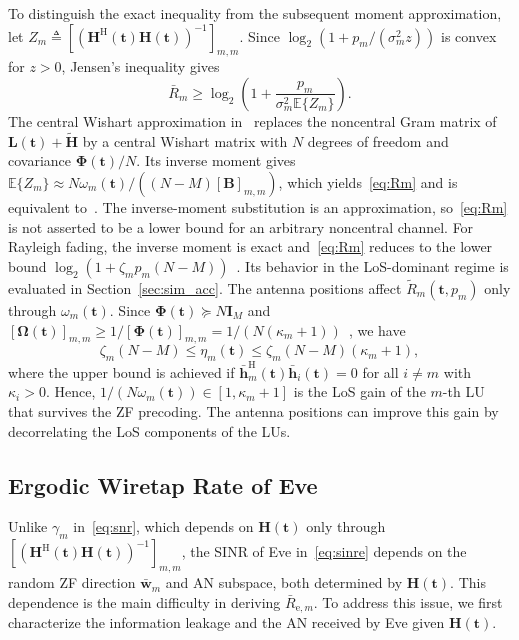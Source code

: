 \documentclass[journal]{IEEEtran}
\newcommand{\E}{\mathbb{E}}
\newcommand{\bt}{\mathbf{t}}
\newcommand{\hb}{\bar{\mathbf{h}}}
\newcommand{\bH}{\mathbf{H}}
\newcommand{\Htl}{\tilde{\mathbf{H}}}
\newcommand{\bB}{\mathbf{B}}
\newcommand{\bL}{\mathbf{L}}
\newcommand{\bI}{\mathbf{I}}
\newcommand{\wb}{\bar{\mathbf{w}}}
\newcommand{\bOm}{\boldsymbol{\Omega}}
\newcommand{\bPhi}{\boldsymbol{\Phi}}
\begin{document}
To distinguish the exact inequality from the subsequent moment approximation, let $Z_m\triangleq[(\bH^{\mathrm{H}}(\bt)\bH(\bt))^{-1}]_{m,m}$. Since $\log_2(1+p_m/(\sigma_m^2 z))$ is convex for $z>0$, Jensen's inequality gives
\begin{equation}\label{eq:lu_jensen_exact}
\bar R_m\ge
\log_2\!\left(1+\frac{p_m}{\sigma_m^2\E\{Z_m\}}\right).
\end{equation}
The central Wishart approximation in~\cite{ZhangJSTSP2014} replaces the noncentral Gram matrix of $\bL(\bt)+\Htl$ by a central Wishart matrix with $N$ degrees of freedom and covariance $\bPhi(\bt)/N$. Its inverse moment gives $\E\{Z_m\}\approx N\omega_m(\bt)/((N-M)[\bB]_{m,m})$, which yields~\eqref{eq:Rm} and is equivalent to~\cite[Sec.~IV-A]{ZhengTCOM2025}. The inverse-moment substitution is an approximation, so~\eqref{eq:Rm} is not asserted to be a lower bound for an arbitrary noncentral channel. For Rayleigh fading, the inverse moment is exact and~\eqref{eq:Rm} reduces to the lower bound $\log_2(1+\zeta_mp_m(N-M))$~\cite{Ngo2013}. Its behavior in the LoS-dominant regime is evaluated in Section~\ref{sec:sim_acc}. The antenna positions affect $\tilde R_m(\bt,p_m)$ only through $\omega_m(\bt)$. Since $\bPhi(\bt)\succeq N\bI_M$ and $[\bOm(\bt)]_{m,m}\ge1/[\bPhi(\bt)]_{m,m}=1/(N(\kappa_m+1))$~\cite{Horn2013}, we have
\begin{equation}\label{eq:etabound}
\zeta_m(N-M)\le\eta_m(\bt)\le\zeta_m(N-M)(\kappa_m+1),
\end{equation}
where the upper bound is achieved if $\hb_m^{\mathrm{H}}(\bt)\hb_i(\bt)=0$ for all $i\neq m$ with $\kappa_i>0$. Hence, $1/(N\omega_m(\bt))\in[1,\kappa_m+1]$ is the LoS gain of the $m$-th LU that survives the ZF precoding. The antenna positions can improve this gain by decorrelating the LoS components of the LUs.

\subsection{Ergodic Wiretap Rate of Eve}\label{sec:eve}

Unlike $\gamma_m$ in~\eqref{eq:snr}, which depends on $\bH(\bt)$ only through $[(\bH^{\mathrm{H}}(\bt)\bH(\bt))^{-1}]_{m,m}$, the SINR of Eve in~\eqref{eq:sinre} depends on the random ZF direction $\wb_m$ and AN subspace, both determined by $\bH(\bt)$. This dependence is the main difficulty in deriving $\bar R_{\mathrm{e},m}$. To address this issue, we first characterize the information leakage and the AN received by Eve given $\bH(\bt)$.
\end{document}

